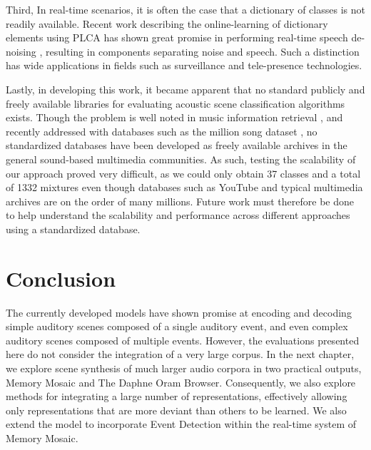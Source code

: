 \documentclass[a4paper,10pt,final]{ThesisStyle}
\begin{document}
Third, In real-time scenarios, it is often the case that a dictionary of classes is not readily available.  Recent work describing the online-learning of dictionary elements using PLCA has shown great promise in performing real-time speech de-noising \cite{Duan2012}, resulting in components separating noise and speech.  Such a distinction has wide applications in fields such as surveillance and tele-presence technologies.  

Lastly, in developing this work, it became apparent that no standard publicly and freely available libraries for evaluating acoustic scene classification algorithms exists.  Though the problem is well noted in music information retrieval \cite{Casey2008b,Rhodes2010}, and recently addressed with databases such as the million song dataset \cite{Bertin-Mahieux2011}, no standardized databases have been developed as freely available archives in the general sound-based multimedia communities.  As such, testing the scalability of our approach proved very difficult, as we could only obtain 37 classes and a total of 1332 mixtures even though databases such as YouTube and typical multimedia archives are on the order of many millions.  Future work must therefore be done to help understand the scalability and performance across different approaches using a standardized database.  

\section{Conclusion}

The currently developed models have shown promise at encoding and decoding simple auditory scenes composed of a single auditory event, and even complex auditory scenes composed of multiple events.  However, the evaluations presented here do not consider the integration of a very large corpus.  In the next chapter, we explore scene synthesis of much larger audio corpora in two practical outputs, Memory Mosaic and The Daphne Oram Browser.  Consequently, we also explore methods for integrating a large number of representations, effectively allowing only representations that are more deviant than others to be learned.  We also extend the model to incorporate Event Detection within the real-time system of Memory Mosaic.



\end{document}
